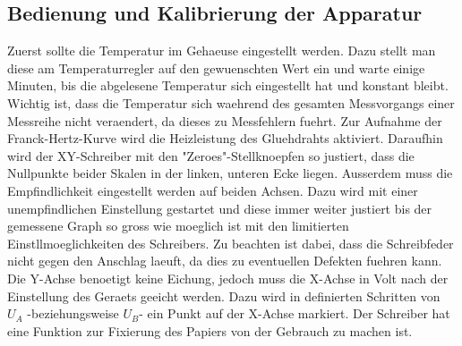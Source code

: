 \subsection{Bedienung und Kalibrierung der Apparatur}
Zuerst sollte die Temperatur im Gehaeuse eingestellt werden. Dazu stellt man diese am Temperaturregler auf den gewuenschten Wert ein und warte einige Minuten, bis die abgelesene Temperatur sich eingestellt hat und konstant bleibt. Wichtig ist, dass die Temperatur sich waehrend des gesamten Messvorgangs einer Messreihe nicht veraendert, da dieses zu Messfehlern fuehrt. Zur Aufnahme der Franck-Hertz-Kurve wird die Heizleistung des Gluehdrahts aktiviert. Daraufhin wird der XY-Schreiber mit den "Zeroes"-Stellknoepfen so justiert, dass die Nullpunkte beider Skalen in der linken, unteren Ecke liegen. Ausserdem muss die Empfindlichkeit eingestellt werden auf beiden Achsen. Dazu wird mit einer unempfindlichen Einstellung gestartet und diese immer weiter justiert bis der gemessene Graph so gross wie moeglich ist mit den limitierten Einstllmoeglichkeiten des Schreibers. Zu beachten ist dabei, dass die Schreibfeder nicht gegen den Anschlag laeuft, da dies zu eventuellen Defekten fuehren kann. Die Y-Achse benoetigt keine Eichung, jedoch muss die X-Achse in Volt nach der Einstellung des Geraets geeicht werden. Dazu wird in definierten Schritten von $U_A$ -beziehungsweise $U_B$- ein Punkt auf der X-Achse markiert. Der Schreiber hat eine Funktion zur Fixierung des Papiers von der Gebrauch zu machen ist.
